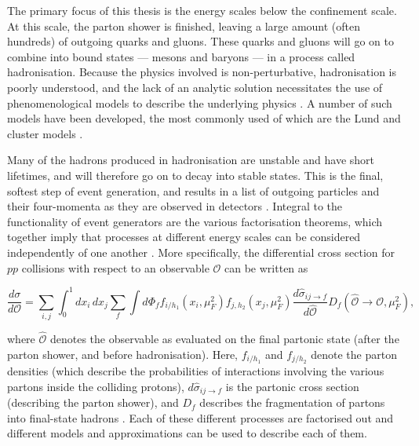 \documentclass[12pt,a4paper]{report}
\begin{document}
The primary focus of this thesis is the energy scales below the confinement scale. At this scale, the parton shower is finished, leaving a large amount (often hundreds) of outgoing quarks and gluons. These quarks and gluons will go on to combine into bound states --- mesons and baryons --- in a process called hadronisation. Because the physics involved is non-perturbative, hadronisation is poorly understood, and the lack of an analytic solution necessitates the use of phenomenological models to describe the underlying physics \cite{Bierlich:2022pfr,Skands:2012ts}. A number of such models have been developed, the most commonly used of which are the Lund \cite{Andersson:1983ia,Andersson:1997xwk} and cluster models \cite{ParticleDataGroup:2024cfk,Buckley:2011ms}.

Many of the hadrons produced in hadronisation are unstable and have short lifetimes, and will therefore go on to decay into stable states. This is the final, softest step of event generation, and results in a list of outgoing particles and their four-momenta as they are observed in detectors \cite{Bierlich:2022pfr,Buckley:2011ms}. Integral to the functionality of event generators are the various factorisation theorems, which together imply that processes at different energy scales can be considered independently of one another \cite{Collins:1981uw, Skands:2012ts}. More specifically, the differential cross section for $pp$ collisions with respect to an observable $\mathcal{O}$ can be written as

\begin{equation}
  \frac{d\sigma}{d\mathcal{O}} = \sum_{i,j} \int_0^1 dx_i \, dx_j \sum_f \int d\Phi_f f_{i/h_1}(x_i,\mu_F^2)f_{j,h_2}(x_j,\mu_F^2) \frac{d \hat{\sigma}_{ij\rightarrow f}}{d\hat{\mathcal{O}}} D_f (\hat{\mathcal{O}} \rightarrow \mathcal{O},\mu_F^2),
\end{equation}

where $\hat{\mathcal{O}}$ denotes the observable as evaluated on the final partonic state (after the parton shower, and before hadronisation). Here, $f_{i/h_1}$ and $f_{j/h_2}$ denote the parton densities (which describe the probabilities of interactions involving the various partons inside the colliding protons), $d\hat{\sigma}_{ij\rightarrow f}$ is the partonic cross section (describing the parton shower), and $D_f$ describes the fragmentation of partons into final-state hadrons \cite{Skands:2012ts}. Each of these different processes are factorised out and different models and approximations can be used to describe each of them.
\end{document}

